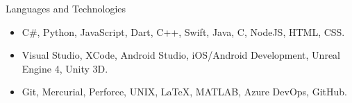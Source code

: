 \documentclass[]{mcdowellcv}
\begin{document}
	\begin{cvsection}{Languages and Technologies}
		\begin{cvsubsection}{}{}{}	
			\begin{itemize}
				\item C\#, Python, JavaScript, Dart, C++, Swift, Java, C, NodeJS, HTML, CSS.
				\item Visual Studio, XCode, Android Studio, iOS/Android Development, Unreal Engine 4, Unity 3D.
				\item Git, Mercurial, Perforce, UNIX, LaTeX, MATLAB, Azure DevOps, GitHub.
			\end{itemize}
		\end{cvsubsection}
	\end{cvsection}
	
\end{document}
